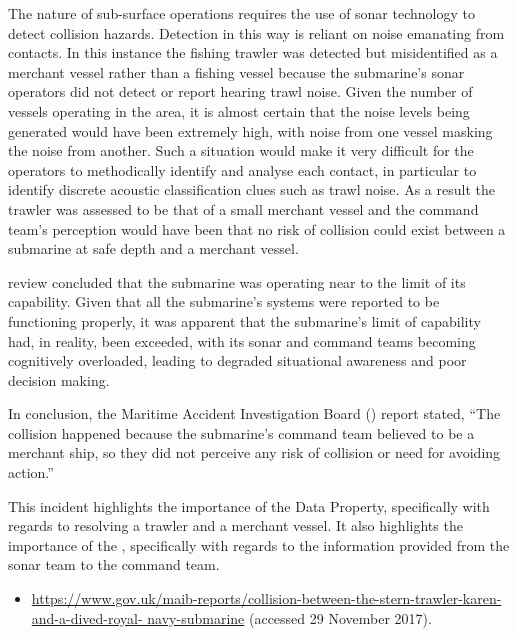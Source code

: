 The nature of sub-surface operations requires the use of sonar technology to detect collision hazards. Detection in this way is reliant on noise emanating from contacts. In this instance the fishing trawler was detected but misidentified as a merchant vessel rather than a fishing vessel because the submarine's sonar operators did not detect or report hearing trawl noise. Given the number of vessels operating in the area, it is almost certain that the noise levels being generated would have been extremely high, with noise from one vessel masking the noise from another. Such a situation would make it very difficult for the  operators to methodically identify and analyse each contact, in particular to identify discrete acoustic classification clues such as trawl noise. As a result the trawler was assessed to be that of a small merchant vessel and the command team's perception would have been that no risk of collision could exist between a submarine at safe depth and a merchant vessel. 

review concluded that the submarine was operating near to the limit of its capability. Given that all the submarine's systems were reported to be functioning properly, it was apparent that the submarine's limit of capability had, in reality, been exceeded, with its sonar and command teams becoming cognitively overloaded, leading to degraded situational awareness and poor decision making.

In conclusion, the Maritime Accident Investigation Board () report stated, ``The collision happened because the submarine's command team believed  to be a merchant ship, so they did not perceive any risk of collision or need for avoiding action.''

This incident highlights the importance of the  Data Property, specifically with regards to resolving a trawler and a merchant vessel. It also highlights the importance of the , specifically with regards to the \gls{information} provided from the sonar team to the command team. 

\begin{samepage}
\begin{itemize}
  \item \raggedright{\href{https://www.gov.uk/maib-reports/collision-between-the-stern-trawler-karen-and-a-dived-royal-navy-submarine}{https://www.gov.uk/maib-reports/collision-between-the-stern-trawler-karen-and-a-dived-royal- navy-submarine} (accessed 29 November 2017).}
\end{itemize}
\end{samepage}


